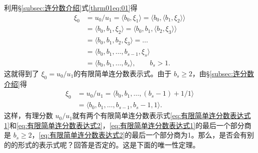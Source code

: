 \begin{theorem}
\begin{equation}
	\end{equation}
	利用\S \ref{subsec:连分数介绍}式\eqref{thrm01eq:01}得
	\begin{align}
		\xi_0 & = u_0 / u_1 = \langle b_0, \xi_1 \rangle = \langle b_0, \langle b_1, \xi_2 \rangle \rangle \nonumber \\
		      & = \langle b_0, b_1, \xi_2 \rangle = \langle b_0, b_1, \langle b_2, \xi_3 \rangle \rangle   \nonumber \\
		      & = \langle b_0, b_1, b_2, \xi_3 \rangle = \dots \nonumber                                             \\
		      & = \langle b_0, b_1, \dots, b_{s-1}, \xi_s \rangle \nonumber                                          \\
		      & = \langle b_0, b_1, \dots, b_s \rangle, \qquad b_s > 1. \label{eq:有限简单连分数表达式1}
	\end{align}
	这就得到了 \( \xi_0 = u_0 / u_1 \)的有限简单连分数表示式。由于 \( b_s \geqslant 2 \)，由\S \ref{subsec:连分数介绍}得
	\begin{align}
		\xi_0 & = u_0 / u_1 = \langle b_0, b_1, \dots, (b_s - 1) + 1/1 \rangle\nonumber                  \\
		      & = \langle b_0, b_1, \dots, b_{s-1}, b_s - 1, 1 \rangle. \label{eq:有限简单连分数表达式2}
	\end{align}
	这样，有理分数 \( u_0 / u_1
	\)就有两个有限简单连分数表示式\eqref{eq:有限简单连分数表达式1}和\eqref{eq:有限简单连分数表达式2}，\eqref{eq:有限简单连分数表达式1}的最后一个部分商是
	\( b_s \geqslant 2
	\)，\eqref{eq:有限简单连分数表达式2}的最后一个部分商为1。那么，是否会有别的的形式的表示式呢？回答是否定的。这是下面的唯一性定理。
\end{theorem}
